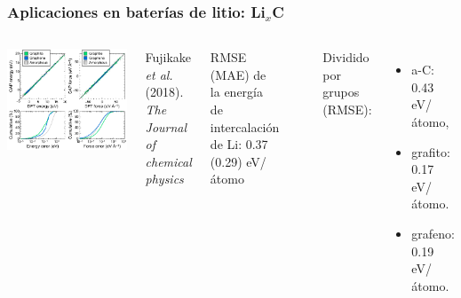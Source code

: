 \documentclass[aspectratio=169]{beamer}
\let\oldtextbf\textbf
\renewcommand{\textbf}[1]{\textcolor{nordblue}{\oldtextbf{#1}}}
\begin{document}
    \begin{frame}
        \frametitle{Aplicaciones en baterías de litio: Li$_x$C}
        
        \begin{columns}
            \begin{center}
                \includegraphics[width=\columnwidth]{LiC-training_testing.png}
            \end{center}
            \tiny{Fujikake \textit{et al.} (2018). \textit{The Journal of chemical
            physics}}

            RMSE (MAE) de la energía de intercalación de Li: 0.37 (0.29) eV/átomo

            \ \pause

            Dividido por grupos (RMSE):
            \begin{itemize}
                \item a-C: 0.43 eV/átomo,
                \item grafito: 0.17 eV/átomo.
                \item grafeno: 0.19 eV/átomo.
            \end{itemize}
        \end{columns}
    \end{frame}
    
    
\end{document}
